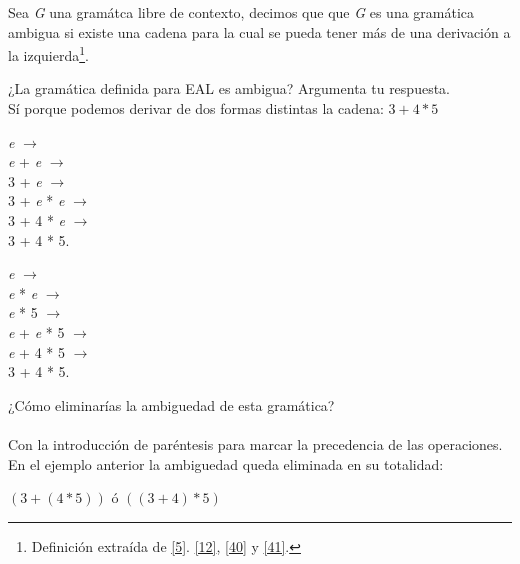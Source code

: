     \begin{definition}
        Sea \textit{G} una gramátca libre de contexto, decimos que que \textit{G} es una gramática ambigua si existe una cadena para la cual se pueda tener más de una derivación a la izquierda\footnote{Definición extraída de \hyperlink{5}{[5]}. \hyperlink{12}{[12]}, \hyperlink{40}{[40]} y \hyperlink{41}{[41]}.}.
    \end{definition}


    \begin{exercise}
        ¿La gramática definida para \textsf{EAL} es ambigua? Argumenta tu respuesta.                          \\
             Sí porque podemos derivar de dos formas distintas la cadena: $3 + 4 * 5$                            
             \begin{center}
                 \textit{e} $\rightarrow$ \\
                 \textit{e} + \textit{e} $\rightarrow$ \\
                 3 + \textit{e} $\rightarrow$ \\
                 3 + \textit{e} * \textit{e} $\rightarrow$ \\
                 3 + 4 * \textit{e} $\rightarrow$ \\
                 3 + 4 * 5.  \\
                 
                 \bigskip
                 
                 \textit{e} $\rightarrow$ \\
                 \textit{e} * \textit{e} $\rightarrow$ \\
                 \textit{e} * 5 $\rightarrow$ \\
                 \textit{e} + \textit{e} * 5 $\rightarrow$ \\
                 \textit{e} + 4 * 5 $\rightarrow$ \\
                 3 + 4 * 5.
             \end{center}
    \end{exercise}

    \bigskip

    \begin{exercise}
        ¿Cómo eliminarías la ambiguedad de esta gramática?    \\\\                    
            Con la introducción de paréntesis para marcar la precedencia de las operaciones. 
            En el ejemplo anterior la ambiguedad queda eliminada en su totalidad:
            \begin{center}
                $(3 + (4 * 5))$  ó $((3 + 4 )* 5)$
            \end{center}
    \end{exercise}


